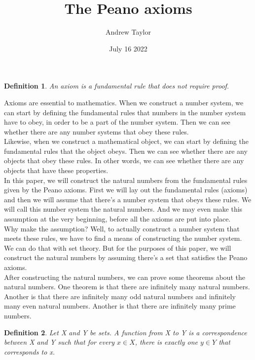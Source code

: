 \documentclass{article}
\title{The Peano axioms}
\author{Andrew Taylor}
\date{July 16 2022}
\newtheorem{definition}{Definition}
\begin{document}
\maketitle

\begin{definition}
An axiom is a fundamental rule that does not require proof.
\end{definition}

Axioms are essential to mathematics. When we construct a number system, we can start by defining the fundamental rules that numbers in the number system have to obey, in order to be a part of the number system. Then we can see whether there are any number systems that obey these rules. \\

Likewise, when we construct a mathematical object, we can start by defining the fundamental rules that the object obeys. Then we can see whether there are any objects that obey these rules. In other words, we can see whether there are any objects that have these properties. \\

In this paper, we will construct the natural numbers from the fundamental rules given by the Peano axioms. First we will lay out the fundamental rules (axioms) and then we will assume that there's a number system that obeys these rules. We will call this number system the natural numbers. And we may even make this assumption at the very beginning, before all the axioms are put into place. \\

Why make the assumption? Well, to actually construct a number system that meets these rules, we have to find a means of constructing the number system. We can do that with set theory. But for the purposes of this paper, we will construct the natural numbers by assuming there's a set that satisfies the Peano axioms. \\

After constructing the natural numbers, we can prove some theorems about the natural numbers. One theorem is that there are infinitely many natural numbers. Another is that there are infinitely many odd natural numbers and infinitely many even natural numbers. Another is that there are infinitely many prime numbers.

\begin{definition}
Let X and Y be sets. A function from X to Y is a correspondence between X and Y such that for every $x \in X$, there is exactly one $y \in Y$ that corresponds to x. 
\end{definition}
\end{document}
